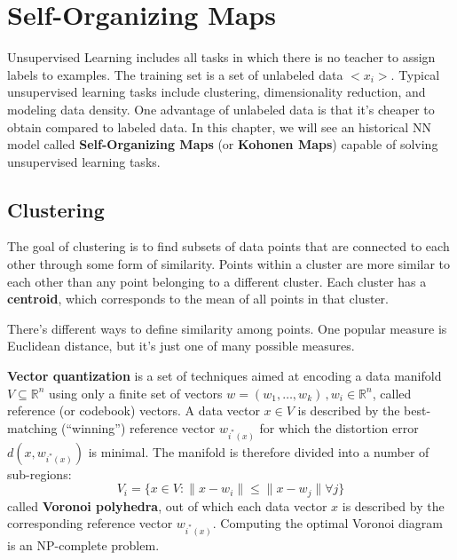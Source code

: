 \chapter{Self-Organizing Maps}

Unsupervised Learning includes all tasks in which there is no teacher to assign labels to examples. The training set is a set of unlabeled data $<x_i>$. Typical unsupervised learning tasks include clustering, dimensionality reduction, and modeling data density. One advantage of unlabeled data is that it's cheaper to obtain compared to labeled data. In this chapter, we will see an historical NN model called \textbf{Self-Organizing Maps} (or \textbf{Kohonen Maps}) capable of solving unsupervised learning tasks. 

\section{Clustering}

The goal of clustering is to find subsets of data points that are connected to each other through some form of similarity. Points within a cluster are more similar to each other than any point belonging to a different cluster. Each cluster has a \textbf{centroid}, which corresponds to the mean of all points in that cluster.

There's different ways to define similarity among points. One popular measure is Euclidean distance, but it's just one of many possible measures.

\textbf{Vector quantization} is a set of techniques aimed at encoding a data manifold $V \subseteq \mathbb{R}^n$ using only a finite set of vectors $w = (w_1,\dots,w_k) \,, w_i \in \mathbb{R}^n$, called reference (or codebook) vectors. A data vector $x \in V$ is described by the best-matching (``winning'') reference vector $w_{i^*(x)}$ for which the distortion error $d(x, w_{i^*(x)})$ is minimal. The manifold is therefore divided into a number of sub-regions:
\begin{equation*}
    V_i = \{ x \in V : \|x - w_i\| \leq \|x - w_j\| \forall j \}
\end{equation*}
called \textbf{Voronoi polyhedra}, out of which each data vector $x$ is described by the corresponding reference vector $w_{i^*(x)}$. Computing the optimal Voronoi diagram is an NP-complete problem.

